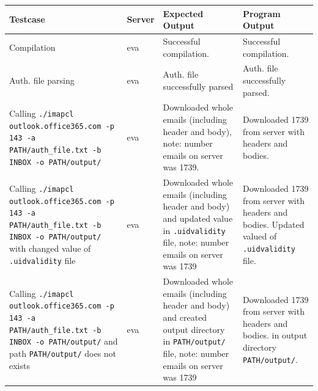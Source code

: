 \documentclass[a4paper,11pt]{article}
\begin{document}
\begin{center}
    \vspace{0.5cm} %
    \begin{tabularx}{\textwidth}{|>{\raggedright\arraybackslash}p{5cm}|>{\raggedright\arraybackslash}p{1cm}|>{\raggedright\arraybackslash}p{5cm}|>{\raggedright\arraybackslash}X|}
        \hline
        \textbf{Testcase} & \textbf{Server} & \textbf{Expected Output} & \textbf{Program Output} \\
        \hline
        Compilation & eva & Successful compilation. & Successful compilation. \\
        \hline
        Auth. file parsing & eva & Auth. file successfully parsed & Auth. file successfully parsed. \\
        \hline
        Calling \texttt{./imapcl outlook.office365.com -p 143 -a PATH/auth\_file.txt -b INBOX -o PATH/output/} & eva & Downloaded whole emails (including header and body), note: number emails on server was 1739. & Downloaded 1739 from server with headers and bodies. \\
        \hline
        Calling \texttt{./imapcl outlook.office365.com -p 143 -a PATH/auth\_file.txt -b INBOX -o PATH/output/} with changed value of \texttt{.uidvalidity} file & eva & Downloaded whole emails (including header and body) and updated value in \texttt{.uidvalidity} file, note: number emails on server was 1739 & Downloaded 1739 from server with headers and bodies. Updated valued of \texttt{.uidvalidity} file. \\
        \hline
        Calling \texttt{./imapcl outlook.office365.com -p 143 -a PATH/auth\_file.txt -b INBOX -o PATH/output/} and path \texttt{PATH/output/} does not exists & eva & Downloaded whole emails (including header and body) and created output directory in \texttt{PATH/output/} file, note: number emails on server was 1739 & Downloaded 1739 from server with headers and bodies. in output directory \texttt{PATH/output/}. \\
        \hline
    \end{tabularx}
    \vspace{0.5cm} %
\end{center}
\end{document}
